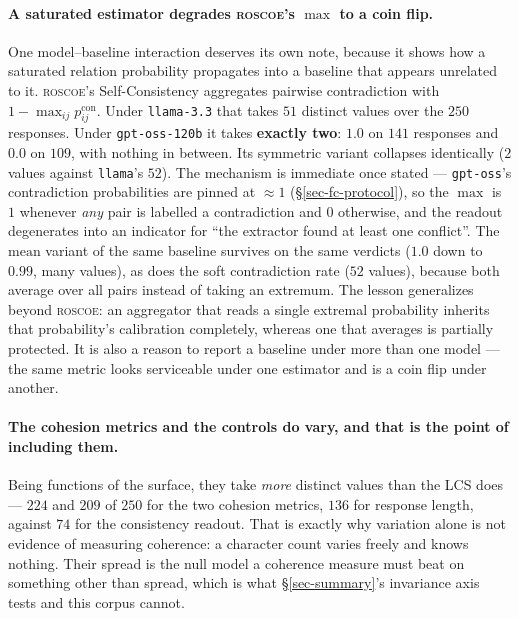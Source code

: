 \paragraph{A saturated estimator degrades \textsc{roscoe}'s $\max$ to a coin flip.} One
model--baseline interaction deserves its own note, because it shows how a saturated relation probability
propagates into a baseline that appears unrelated to it. \textsc{roscoe}'s Self-Consistency aggregates
pairwise contradiction with $1 - \max_{ij} p^{\mathrm{con}}_{ij}$. Under \texttt{llama-3.3} that takes
$51$ distinct values over the $250$ responses. Under \texttt{gpt-oss-120b} it takes
\textbf{exactly two}: $1.0$ on $141$ responses and $0.0$ on $109$, with nothing in between. Its
symmetric variant collapses identically ($2$ values against \texttt{llama}'s $52$). The mechanism
is immediate once stated --- \texttt{gpt-oss}'s contradiction probabilities are pinned at
$\approx\!1$ (\S\ref{sec-fc-protocol}), so the $\max$ is $1$ whenever \emph{any} pair is labelled a
contradiction and $0$ otherwise, and the readout degenerates into an indicator for ``the extractor found
at least one conflict''. The $\mathrm{mean}$ variant of the same baseline survives on the same verdicts
($1.0$ down to $0.99$, many values), as does the soft contradiction rate ($52$ values), because both
average over all pairs instead of taking an extremum. The lesson generalizes beyond \textsc{roscoe}: an
aggregator that reads a single extremal probability inherits that probability's calibration completely,
whereas one that averages is partially protected. It is also a reason to report a baseline under more
than one model --- the same metric looks serviceable under one estimator and is a coin flip under
another.

\paragraph{The cohesion metrics and the controls do vary, and that is the point of including them.}
Being functions of the surface, they take \emph{more} distinct values than the LCS does
--- $224$ and $209$ of $250$ for the two cohesion metrics, $136$ for response length, against $74$ for
the consistency readout. That is exactly why variation alone is not evidence of measuring coherence: a
character count varies freely and knows nothing. Their spread is the null model a coherence measure must
beat on something other than spread, which is what \S\ref{sec-summary}'s invariance axis tests and this
corpus cannot.

